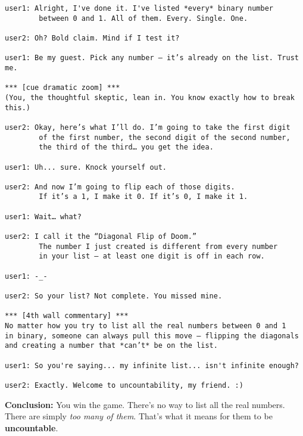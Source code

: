 \begin{verbatim}
user1: Alright, I've done it. I've listed *every* binary number 
        between 0 and 1. All of them. Every. Single. One.

user2: Oh? Bold claim. Mind if I test it?

user1: Be my guest. Pick any number — it’s already on the list. Trust me.

*** [cue dramatic zoom] ***
(You, the thoughtful skeptic, lean in. You know exactly how to break this.)

user2: Okay, here’s what I’ll do. I’m going to take the first digit 
        of the first number, the second digit of the second number, 
        the third of the third… you get the idea.

user1: Uh... sure. Knock yourself out.

user2: And now I’m going to flip each of those digits.
        If it’s a 1, I make it 0. If it’s 0, I make it 1.

user1: Wait… what?

user2: I call it the “Diagonal Flip of Doom.” 
        The number I just created is different from every number 
        in your list — at least one digit is off in each row.

user1: -_-

user2: So your list? Not complete. You missed mine.

*** [4th wall commentary] ***
No matter how you try to list all the real numbers between 0 and 1 
in binary, someone can always pull this move — flipping the diagonals 
and creating a number that *can’t* be on the list.

user1: So you're saying... my infinite list... isn't infinite enough?

user2: Exactly. Welcome to uncountability, my friend. :)
\end{verbatim}


\medskip

\noindent
\textbf{Conclusion:} You win the game. There’s no way to list all the real numbers. There are simply \textit{too many of them}. That’s what it means for them to be \textbf{uncountable}.


  

